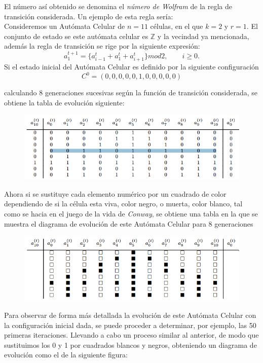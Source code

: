 El número así obtenido se denomina el \textit{número de Wolfram} de la regla de transición considerada. Un ejemplo de esta regla sería:\\

Consideremos un Autómata Celular de $n = 11$ células, en el que $k = 2$ y $r = 1$. El conjunto de estado se este autómata celular es $\mathbb{Z}$ y la vecindad ya mencionada, además la regla de transición se rige por la siguiente expresión:
$$a_1^{t+1} = \lbrace a_{i-1}^t + a_{1}^t +a_{i+1}^t \rbrace mod 2, \qquad i \geq 0.  $$
Si el estado inicial del Autómata Celular es definido por la siguiente configuración
$$C^0 = (0,0,0,0,0,1,0,0,0,0,0)$$

calculando 8 generaciones sucesivas según la función de transición considerada, se obtiene la tabla de evolución siguiente:

\begin{figure}[H]
\centering
\includegraphics[scale=0.7]{imagenes/ejemplo_1.png}
\end{figure}

Ahora si se sustituye cada elemento numérico por un cuadrado de color dependiendo de si la célula esta viva, color negro, o muerta, color blanco, tal como se hacia en el juego de la vida de \textit{Conway}, se obtiene una tabla en la que se muestra el diagrama de evolución de este Autómata Celular para 8 generaciones

\begin{figure}[H]
\centering
\includegraphics[scale=0.7]{imagenes/ejemplo_2.png}
\end{figure}

Para observar de forma más detallada la evolución de este Autómata Celular con la configuración inicial dada, se puede proceder a determinar, por ejemplo, las 50 primeras iteraciones. Llevando a cabo un proceso similar al anterior, de modo que sustituimos los 0 y 1 por cuadrados blancos y negros, obteniendo un diagrama de evolución como el de la siguiente figura:
 
